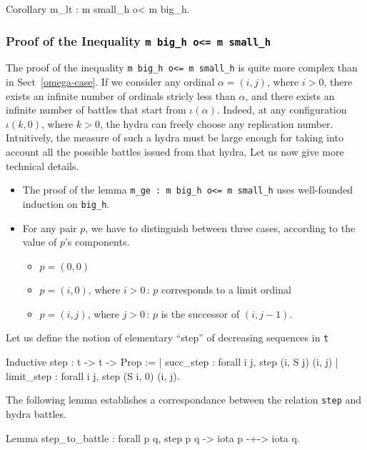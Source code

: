 \begin{Coqsrc}
   Corollary m_lt : m small_h o< m big_h.
\end{Coqsrc}


\subsubsection{Proof of the Inequality \texttt{m big\_h o<= m small\_h} }


The proof of the inequality \texttt{m big\_h o<= m small\_h} is quite more complex than in Sect~\ref{omega-case}.  If we consider any ordinal $\alpha=(i,j)$, where $i>0$, there exists an infinite number of
ordinals stricly less than $\alpha$, and there exists an infinite number of battles that start from
$\iota(\alpha)$. Indeed, at any configuration $\iota(k,0)$, where $k>0$, the hydra can freely choose any replication number. Intuitively, the measure of such a hydra must be large enough for taking into account
all the possible battles issued from that hydra.
Let us now give more technical details.

\begin{itemize}
\item The proof of the lemma \texttt{m\_ge : m big\_h  o<= m small\_h} uses well-founded induction on \texttt{big\_h}.

\item For any pair $p$, we have to distinguish between three cases, according to the value of $p$'s components.
  \begin{itemize}
  \item $p=(0,0)$
  \item $p=(i,0)$, where $i>0$\,: $p$ corresponds to a limit ordinal
  \item $p=(i,j)$, where $j>0$\,: $p$ is the successor of $(i,j-1)$.
  \end{itemize}
\end{itemize}


Let us define the notion of elementary ``step'' of decreasing sequences in
\texttt{t}


\begin{Coqsrc}
  Inductive step : t -> t -> Prop :=
  | succ_step : forall i j,  step (i, S j) (i, j)
  | limit_step : forall i j, step (S i, 0) (i, j).
\end{Coqsrc}

The following lemma establishes a correspondance between the relation
\texttt{step} and hydra battles.

\begin{Coqsrc}
  Lemma step_to_battle : forall p q, step p q -> iota p -+-> iota q.
\end{Coqsrc}

